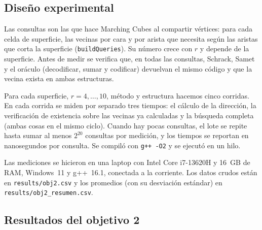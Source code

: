 \subsection{Diseño experimental}

Las consultas son las que hace Marching Cubes al compartir vértices: para cada celda
de superficie, las vecinas por cara y por arista que necesita según las aristas que
corta la superficie (\texttt{buildQueries}). Su número crece con $r$ y depende de la
superficie. Antes de medir se verifica que, en todas las consultas, Schrack, Samet y
el oráculo (decodificar, sumar y codificar) devuelvan el mismo código y que la vecina
exista en ambas estructuras.

Para cada superficie, $r=4,\dots,10$, método y estructura hacemos cinco corridas.
En cada corrida se miden por separado tres tiempos: el cálculo de la dirección, la
verificación de existencia sobre las vecinas ya calculadas y la búsqueda completa
(ambas cosas en el mismo ciclo). Cuando hay pocas consultas, el lote se repite hasta
sumar al menos $2^{20}$ consultas por medición, y los tiempos se reportan en
nanosegundos por consulta. Se compiló con \texttt{g++ -O2} y se ejecutó en un hilo.

Las mediciones se hicieron en una laptop con Intel Core i7-13620H y 16~GB de RAM,
Windows~11 y g++~16.1, conectada a la corriente. Los datos crudos están en
\texttt{results/obj2.csv} y los promedios (con su desviación estándar) en
\texttt{results/obj2\_resumen.csv}.

\subsection{Resultados del objetivo 2}

